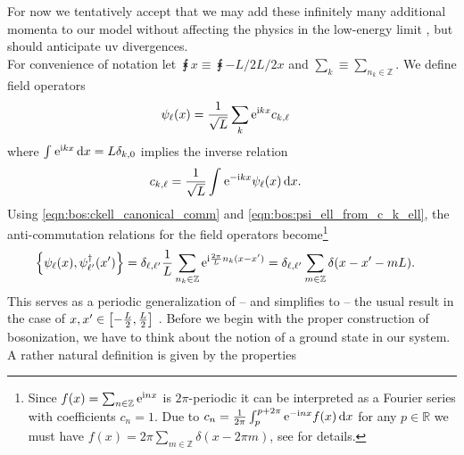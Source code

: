 For now we tentatively accept that we may add these infinitely many additional momenta to our model without affecting the physics in the low-energy limit \cite{FermiLiquid_LL_review_Voit_1995}, but should anticipate \gls{uv} divergences.\\
For convenience of notation let $\intx{ }{ }{ }{x} \equiv \intx{-L/2}{L/2}{ }{x}$ and $\sum_k \equiv \sum_{n_k\in\mathbb{Z}}$.
We define field operators
\begin{align}
\psi_\ell(x) &= \frac{1}{\sqrt{L}} \sum_k \powe{\i kx} c_{k,\ell} \label{eqn:bos:psi_ell_from_c_k_ell}
\end{align}
where $\intx{ }{ }{\powe{\i kx}}{x}=L\delta_{k,0}$ implies the inverse relation
\begin{align}
c_{k,\ell} &= \frac{1}{\sqrt{L}} \intx{ }{ }{\powe{-\i kx} \psi_\ell(x)}{x}. \label{eqn:bos:c_k_ell_from_psi_ell}
\end{align}
Using \autoref{eqn:bos:ckell_canonical_comm} and \autoref{eqn:bos:psi_ell_from_c_k_ell}, the anti-commutation relations for the field operators become\footnote{Since $f(x) = \sum_{n\in\mathbb{Z}} \powe{\i nx}$ is $2\pi$-periodic it can be interpreted as a Fourier series with coefficients $c_n=1$. Due to $c_n = \frac{1}{2\pi} \intx{p}{p+2\pi}{\powe{-\i nx} f(x)}{x}$ for any $p\in\mathbb{R}$ we must have $f(x) = 2\pi \sum_{m\in\mathbb{Z}} \delta(x - 2\pi m)$, see \cite[--32]{GelfandShilov_1964} for details.} %
\begin{align*}
\klc*{\psi_\ell(x), \psi_{\ell'}^\dagger(x')} &= \delta_{\ell,\ell'} \frac{1}{L} \sum_{n_k\in\mathbb{Z}} \powe{\i \frac{2\pi}{L} n_k (x-x')} = \delta_{\ell,\ell'} \sum_{m\in\mathbb{Z}} \delta\kla*{x-x'-mL}.
\end{align*}%
This serves as a periodic generalization of -- and simplifies to -- the usual result in the case of $x,x'\in \klb*{-\frac{L}{2},\frac{L}{2}}$ \cite[]{Bosonization_DelftSchoeller_1998}.
Before we begin with the proper construction of bosonization, we have to think about the notion of a ground state in our system.
A rather natural definition is given by the properties
